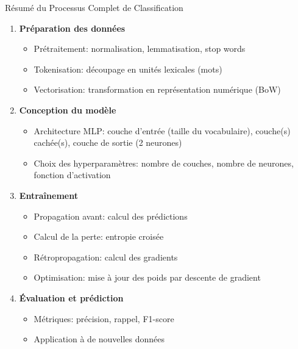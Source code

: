 \documentclass[aspectratio=169,11pt]{beamer}
\begin{document}
\begin{frame}{Résumé du Processus Complet de Classification}
    \begin{enumerate}
        \item \textbf{Préparation des données}
        \begin{itemize}
            \item Prétraitement: normalisation, lemmatisation, stop words
            \item Tokenisation: découpage en unités lexicales (mots)
            \item Vectorisation: transformation en représentation numérique (BoW)
        \end{itemize}
        \vspace{0.1cm}
        \item \textbf{Conception du modèle}
        \begin{itemize}
            \item Architecture MLP: couche d'entrée (taille du vocabulaire), couche(s) cachée(s), couche de sortie (2 neurones)
            \item Choix des hyperparamètres: nombre de couches, nombre de neurones, fonction d'activation
        \end{itemize}
        \vspace{0.1cm}
        \item \textbf{Entraînement}
        \begin{itemize}
            \item Propagation avant: calcul des prédictions
            \item Calcul de la perte: entropie croisée
            \item Rétropropagation: calcul des gradients
            \item Optimisation: mise à jour des poids par descente de gradient
        \end{itemize}
        \vspace{0.1cm}
        \item \textbf{Évaluation et prédiction}
        \begin{itemize}
            \item Métriques: précision, rappel, F1-score
            \item Application à de nouvelles données
        \end{itemize}
    \end{enumerate}
\end{frame}
\end{document}
